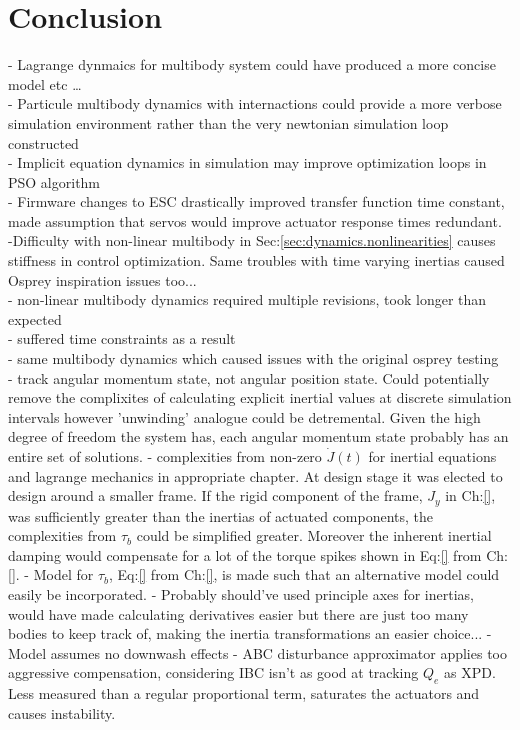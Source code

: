 \chapter{Conclusion}
\label{ch:conclusion}
- Lagrange dynmaics for multibody system could have produced a more concise model etc \ldots\\
- Particule multibody dynamics with internactions could provide a more verbose simulation environment rather than the very newtonian simulation loop constructed\\
- Implicit equation dynamics in simulation may improve optimization loops in PSO algorithm\\
- Firmware changes to ESC drastically improved transfer function time constant, made assumption that servos would improve actuator response times redundant.\\
-Difficulty with non-linear multibody in Sec:\ref{sec:dynamics.nonlinearities} causes stiffness in control optimization. Same troubles with time varying inertias caused Osprey inspiration issues too...\\
- non-linear multibody dynamics required multiple revisions, took longer than expected\\
- suffered time constraints as a result\\
- same multibody dynamics which caused issues with the original osprey testing\cite{}\\
- track angular momentum state, not angular position state. Could potentially remove the complixites of calculating explicit inertial values at discrete simulation intervals however 'unwinding' analogue could be detremental. Given the high degree of freedom the system has, each angular momentum state probably has an entire set of solutions.
- complexities from non-zero $\dot{J}(t)$ for inertial equations and lagrange mechanics in appropriate chapter. At design stage it was elected to design around a smaller frame. If the rigid component of the frame, $J_y$ in Ch:\ref{}, was sufficiently greater than the inertias of actuated components, the complexities from $\tau_b$ could be simplified greater. Moreover the inherent inertial damping would compensate for a lot of the torque spikes shown in Eq:\ref{} from Ch:\ref{}.
- Model for $\tau_b$, Eq:\ref{} from Ch:\ref{}, is made such that an alternative model could easily be incorporated.
- Probably should've used principle axes for inertias, would have made calculating derivatives easier but there are just too many bodies to keep track of, making the inertia transformations an easier choice...
-Model assumes no downwash effects
- ABC disturbance approximator applies too aggressive compensation, considering IBC isn't as good at tracking $Q_e$ as XPD. Less measured than a regular proportional term, saturates the actuators and causes instability.
